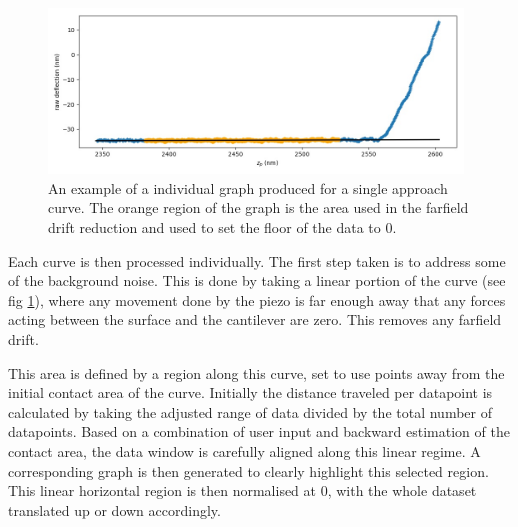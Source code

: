 \begin{figure}[h!]     %
        \begin{center}
          \includegraphics[width=110mm]{chapter4/farfielddrift.jpg}
\end{center}
\caption{An example of a individual graph produced for a single approach curve. The orange region of the graph is the area used in the farfield drift reduction and used to set the floor of the data to 0.}
\label{fig:farfielddrift}                 %
\end{figure}

Each curve is then processed individually. The first step taken is to address some of the background noise. This is done by taking a linear portion of the curve (see fig \ref{fig:farfielddrift}), where any movement done by the piezo is far enough away that any forces acting between the surface and the cantilever are zero. This removes any farfield drift.  %

This area is defined by a region along this curve, set to use points away from the initial contact area of the curve. Initially the distance traveled per datapoint is calculated by taking the adjusted range of data divided by the total number of datapoints. Based on a combination of user input and backward estimation of the contact area, the data window is carefully aligned along this linear regime. A corresponding graph is then generated to clearly highlight this selected region. This linear horizontal region is then normalised at 0, with the whole dataset translated up or down accordingly.

